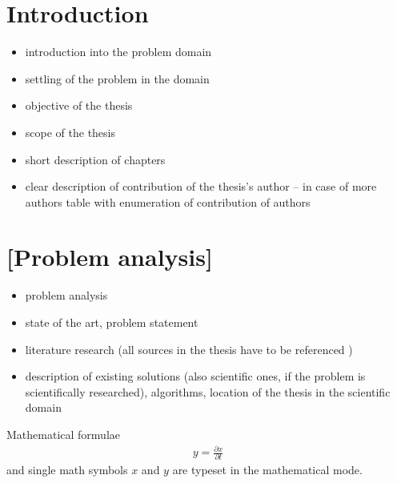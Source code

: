 \documentclass[a4paper,twoside,12pt]{book}
\newcounter{pagesWithoutNumbers}
\begin{document}
\setcounter{pagesWithoutNumbers}{\value{page}}
\mainmatter
\pagestyle{empty}

\cleardoublepage

\pagestyle{PageNumbersChapterTitles}


\chapter{Introduction}

\begin{itemize}
\item introduction into the problem domain
\item settling of the problem in the domain
\item objective of the thesis 
\item scope of the thesis
\item short description of chapters
\item clear description of contribution of the thesis's author – in case of more authors table with enumeration of contribution of authors
\end{itemize}


\chapter{[Problem analysis]}

\begin{itemize}
\item  problem analysis
\item state of the art, problem statement
\item  literature research (all sources in the thesis have to be referenced \cite{bib:article,bib:book,bib:conference,bib:internet})
\item description of existing solutions (also scientific ones, if the problem is scientifically researched), algorithms,  location of the thesis in the scientific domain
\end{itemize}



Mathematical formulae  
\begin{align}
y = \frac{\partial x}{\partial t}
\end{align}
and single math symbols $x$ and $y$ are typeset in the mathematical mode.
\end{document}

